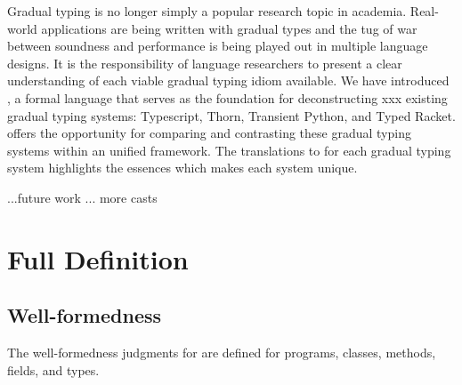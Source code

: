 \documentclass[acmlarge, anonymous, authordraft, review]{acmart} %
\begin{document}
Gradual typing is no longer simply a popular research topic in academia.
Real-world applications are being written with gradual types and the tug of
war between soundness and performance is being played out in multiple
language designs.  It is the responsibility of language researchers to
present a clear understanding of each viable gradual typing idiom available.
We have introduced \kafka, a formal language that serves as the foundation
for deconstructing xxx existing gradual typing systems: Typescript, Thorn,
Transient Python, and Typed Racket.
\kafka offers the
opportunity for comparing and contrasting these gradual typing systems
within an unified framework. The translations to \kafka for each gradual
typing system highlights the essences which makes each system unique.

...future work ... more casts




\clearpage

\appendix
\section{Full \kafka Definition}%
\label{appendix:kafka}

\subsection{Well-formedness}

The well-formedness judgments for \kafka are defined for programs, classes, methods, fields, and types.

~\\

\vspace{-3mm}
\begin{mathpar}
\end{mathpar}

\vspace{-2.5mm}
\begin{mathpar}
\end{mathpar}
\end{document}
